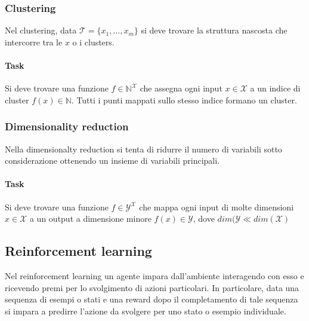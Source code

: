 		\subsubsection{Clustering}
		Nel clustering, data $\mathcal{T}=\{x_1, \dots, x_m\}$ si deve trovare la struttura nascosta che intercorre tra le $x$ o i clusters.

			\paragraph{Task}
			Si deve trovare una funzione $f\in\mathbb{N}^{\mathcal{X}}$ che assegna ogni input $x\in\mathcal{X}$ a un indice di cluster $f(x)\in\mathbb{N}$.
			Tutti i punti mappati sullo stesso indice formano un cluster.

		\subsubsection{Dimensionality reduction}
		Nella dimensionalty reduction si tenta di ridurre il numero di variabili sotto considerazione ottenendo un insieme di variabili principali.

			\paragraph{Task}
			Si deve trovare una funzione $f\in\mathcal{Y}^\mathcal{X}$ che mappa ogni input di molte dimensioni $x\in\mathcal{X}$ a un output a dimensione minore $f(x)\in\mathcal{Y}$, dove $dim(\mathcal{Y}\ll dim(\mathcal{X})$

	\subsection{Reinforcement learning}
	Nel reinforcement learning un agente impara dall'ambiente interagendo con esso e ricevendo premi per lo svolgimento di azioni particolari.
	In particolare, data una sequenza di esempi o stati e una reward dopo il completamento di tale sequenza si impara a predirre l'azione da svolgere per uno stato o esempio individuale.

